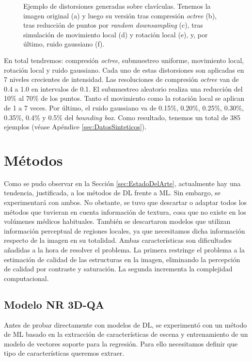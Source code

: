 \begin{figure}[htp]
\begin{subfigure}[b]{.5\textwidth}
    \caption{}
  \end{subfigure}
  \caption[Ejemplo de distorsiones generadas sobre clavículas.]{Ejemplo de distorsiones generadas sobre clavículas.
    Tenemos la imagen original (a) y luego su versión tras compresión \emph{octree} (b), 
    tras reducción de puntos por \emph{random downsampling} (c), tras simulación 
    de movimiento local (d) y rotación local (e), y, por último, ruido gaussiano (f).
  }
  \label{fig:DistorsionesGeneradas}
\end{figure}

En total tendremos: compresión \emph{octree}, submuestreo uniforme, movimiento local, rotación local 
y ruido gaussiano. Cada uno de estas distorsiones son 
aplicadas en 7 niveles crecientes de intensidad.
Las resoluciones de compresión \emph{octree} van de 0.4 a 1.0 en intervalos de 0.1.
El submuestreo aleatorio realiza una reducción del 10\% al 70\% de los puntos.
Tanto el movimiento como la rotación local se aplican de 1 a 7 veces.
Por último, el ruido gaussiano va de 0.15\%, 0.20\%, 0.25\%, 0.30\%, 0.35\%, 0.4\% y 0.5\% del \emph{bounding box}. 
Como resultado, tenemos un total de 385 ejemplos (véase Apéndice \ref{sec:DatosSinteticos}). 

\section{Métodos}
Como se pudo observar en la Sección \ref{sec:EstadoDelArte}, actualmente hay una 
tendencia, justificada, a los métodos de DL frente a ML. Sin embargo, se experimentará con 
ambos. No obstante, se tuvo 
que descartar o adaptar todos los métodos que tuvieran en cuenta información de textura, 
cosa que no existe en los volúmenes médicos habituales. También se descartaron 
modelos que utilizan información perceptual de regiones locales, ya que necesitamos 
dicha información respecto de la imagen en su totalidad. 
Ambas características son dificultades añadidas a la hora 
de resolver el problema. La primera restringe el problema 
a la estimación de calidad de las estructuras en la imagen, eliminando la 
percepción de calidad por contraste y saturación. La segunda incrementa 
la complejidad computacional. 

\subsection{Modelo NR 3D-QA}
\label{sec:NR3DQA}
Antes de probar directamente con modelos de DL, se experimentó con un método de 
ML basado en la extracción de características de escena y entrenamiento de un 
modelo de vectores soporte para la regresión. Para ello necesitamos definir 
que tipo de características queremos extraer. 

